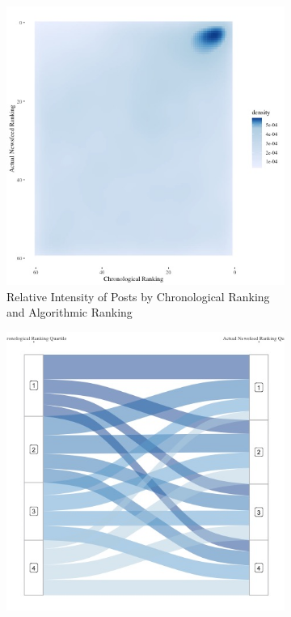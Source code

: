 \documentclass[12pt,letterpaper]{article}
\begin{document}
\begin{figure}[ht]
\caption{Relationship between Newsfeed Algorithmic Ranking and Chronology and User Stated Preferences }
\label{fig:nf}
    \begin{subfigure}{.5\textwidth} 
        \centering
        \includegraphics[width=1\linewidth]{Output/Graphs/Audit/Heatmaps/US NF chron rank by nf rank - smooth.jpg}   
        \caption{Relative Intensity of Posts by Chronological Ranking and Algorithmic Ranking}
        \label{fig:nftime_hm}
        \end{subfigure}
    \begin{subfigure}{.5\textwidth}
       \centering
        \includegraphics[width=1\linewidth]{Output/Graphs/Audit/Sankey flows/US NF chronology to actual.jpg}  

\end{subfigure}
\end{figure}
\end{document}

